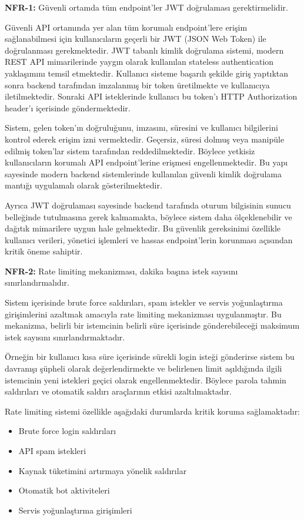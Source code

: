 \noindent\textbf{NFR-1:} Güvenli ortamda tüm endpoint’ler JWT doğrulaması gerektirmelidir.

Güvenli API ortamında yer alan tüm korumalı endpoint’lere erişim sağlanabilmesi için kullanıcıların geçerli bir JWT (JSON Web Token) ile doğrulanması gerekmektedir. JWT tabanlı kimlik doğrulama sistemi, modern REST API mimarilerinde yaygın olarak kullanılan stateless authentication yaklaşımını temsil etmektedir. Kullanıcı sisteme başarılı şekilde giriş yaptıktan sonra backend tarafından imzalanmış bir token üretilmekte ve kullanıcıya iletilmektedir. Sonraki API isteklerinde kullanıcı bu token’ı HTTP Authorization header’ı içerisinde göndermektedir.

Sistem, gelen token’ın doğruluğunu, imzasını, süresini ve kullanıcı bilgilerini kontrol ederek erişim izni vermektedir. Geçersiz, süresi dolmuş veya manipüle edilmiş token’lar sistem tarafından reddedilmektedir. Böylece yetkisiz kullanıcıların korumalı API endpoint’lerine erişmesi engellenmektedir. Bu yapı sayesinde modern backend sistemlerinde kullanılan güvenli kimlik doğrulama mantığı uygulamalı olarak gösterilmektedir.

Ayrıca JWT doğrulaması sayesinde backend tarafında oturum bilgisinin sunucu belleğinde tutulmasına gerek kalmamakta, böylece sistem daha ölçeklenebilir ve dağıtık mimarilere uygun hale gelmektedir. Bu güvenlik gereksinimi özellikle kullanıcı verileri, yönetici işlemleri ve hassas endpoint’lerin korunması açısından kritik öneme sahiptir.

\noindent\textbf{NFR-2:} Rate limiting mekanizması, dakika başına istek sayısını sınırlandırmalıdır.

Sistem içerisinde brute force saldırıları, spam istekler ve servis yoğunlaştırma girişimlerini azaltmak amacıyla rate limiting mekanizması uygulanmıştır. Bu mekanizma, belirli bir istemcinin belirli süre içerisinde gönderebileceği maksimum istek sayısını sınırlandırmaktadır.

Örneğin bir kullanıcı kısa süre içerisinde sürekli login isteği gönderirse sistem bu davranışı şüpheli olarak değerlendirmekte ve belirlenen limit aşıldığında ilgili istemcinin yeni istekleri geçici olarak engellenmektedir. Böylece parola tahmin saldırıları ve otomatik saldırı araçlarının etkisi azaltılmaktadır.

Rate limiting sistemi özellikle aşağıdaki durumlarda kritik koruma sağlamaktadır:

\begin{itemize}[leftmargin=*]
    \item Brute force login saldırıları
    \item API spam istekleri
    \item Kaynak tüketimini artırmaya yönelik saldırılar
    \item Otomatik bot aktiviteleri
    \item Servis yoğunlaştırma girişimleri
\end{itemize}

